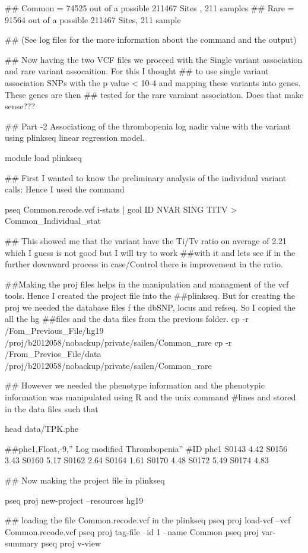 ## Common = 74525 out of a possible 211467 Sites , 211 samples
## Rare =  91564 out of a possible 211467 Sites, 211 sample

## (See log files for the more information about the command and the output)

## Now having the two VCF files we proceed with the Single variant association and rare variant assocaition. For this I thought ## to use single variant association SNPs with the p value < 10-4 and mapping these variants into genes. These genes are then ## tested for the rare varaiant association. Does that make sense???

## Part -2 Associationg of the thrombopenia log nadir value with the variant using plinkseq linear regression model.
 
 module load plinkseq
 
 ## First I wanted to know the preliminary analysis of the individual variant calls: Hence I used the command
 
 pseq Common.recode.vcf i-stats | gcol ID NVAR SING TITV > Common_Individual_stat
 
 ## This showed me that the variant have the Ti/Tv ratio on average of 2.21 which I guess is not good but I will try to work ##with it and lets see if in the further downward process in case/Control there is improvement in the ratio.

##Making the proj files helps in the manipulation and managment of the vcf tools. Hence I created the project file into the ##plinkseq. But for creating the proj we needed the database files f the dbSNP, locus and refseq. So I copied the all the hg ##files and the data files from the previous folder.
 cp -r /Fom_Previous_File/hg19 /proj/b2012058/nobackup/private/sailen/Common_rare
 cp -r /From_Previos_File/data /proj/b2012058/nobackup/private/sailen/Common_rare
 
## However we needed the phenotype information and the phenotypic information was manipulated using R and the unix command  #lines  and stored in the data files such that
 
head data/TPK.phe 
 
##phe1,Float,-9,” Log modified Thrombopenia”
#ID	phe1
S0143	4.42
S0156	3.43
S0160	5.17
S0162	2.64
S0164	1.61
S0170	4.48
S0172	5.49
S0174	4.83
 
## Now making the project file in plinkseq

pseq proj new-project --resources hg19

## loading the file Common.recode.vcf in the plinkseq
pseq proj load-vcf --vcf Common.recode.vcf 
pseq proj tag-file --id 1 --name Common
pseq proj var-summary
pseq proj v-view

